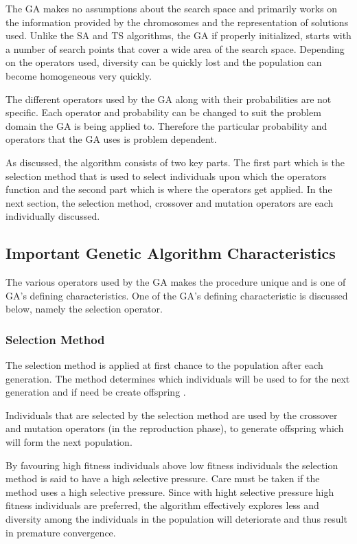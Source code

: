 The \gls{GA} makes no assumptions about the search space and primarily works on the information provided by the chromosomes and the representation of solutions used\cite{CompuIntelligenceIntro,ConstrainedGA,HybridIntelliGA}. Unlike the \gls{SA} and \gls{TS} algorithms, the \gls{GA} if properly initialized, starts with a number of search points that cover a wide area of the search space. Depending on the operators used, diversity can be quickly lost and the population can become homogeneous very quickly\cite{DistributedHierarchicalGA,FamilyGA,HybridIntelliGA}\label{GASearchPoints}.
 
The different operators used by the GA along with their probabilities are not specific. Each operator and probability can be changed to suit the problem domain the GA is being applied to. Therefore the particular probability and operators that the GA uses is problem dependent.

As discussed, the algorithm consists of two key parts. The first part which is the selection method that is used to select individuals upon which the operators function and the second part which is where the operators get applied. In the next section, the selection method, crossover and mutation operators are each individually discussed.

\subsection{Important Genetic Algorithm Characteristics}
The various operators used by the \gls{GA} makes the procedure unique and is one of \gls{GA}'s defining characteristics. One of the \gls{GA}'s defining characteristic is discussed below, namely the selection operator.

\subsubsection{Selection Method}
\label{sec:selectionmethod}
The selection method is applied at first chance to the population after each generation. The method determines which individuals will be used to for the next generation and if need be create offspring \cite{CoactiveFuzzyGA,CombinedBranchBoundGA,ConstrainedGA}.

Individuals that are selected by the selection method are used by the crossover and mutation operators (in the reproduction phase), to generate offspring which will form the next population\cite{AdaptiveSAGA,AcceleratingGA}.

By favouring high fitness individuals above low fitness individuals the selection method is said to have a high selective pressure\cite{CompuIntelligenceIntro}. Care must be taken if the method uses a high selective pressure. Since with hight selective pressure high fitness individuals are preferred, the algorithm effectively explores less and diversity among the individuals in the population will deteriorate and thus result in premature convergence\cite{ConstrainedGA, CompuIntelligenceIntro}.

